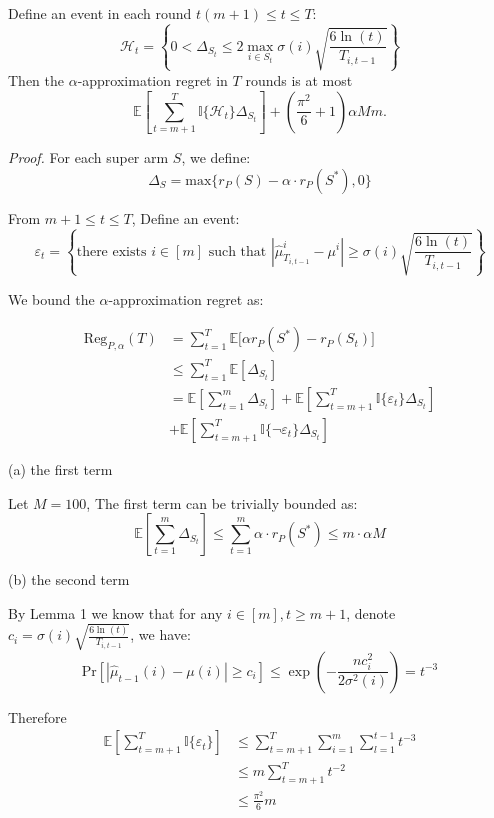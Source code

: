 \documentclass[opre,sglanonrev]{informs4}
\begin{document}
\begin{lemma}
Define an event in each round $t(m+1)\leq t \leq T$:
$$
	\mathcal{H}_t = \left\{0<\Delta_{S_t}\leq 2\mathop{\max}\limits_{i\in S_t}\sigma(i)\sqrt{\frac{6\ln(t)}{T_{i,t-1}}}\right\}
$$
Then the $\alpha$-approximation regret in $T$ rounds is at most
$$
	\mathbb{E}[\sum_{t=m+1}^{T}\mathbb{I}\{\mathcal{H}_t\}\Delta_{S_t}] + (\frac{\pi^2}{6}+1)\alpha M m.
$$
\end{lemma}
\textit{Proof.} For each super arm $S$, we define:
$$
\Delta_S = \text{max}\{r_P(S) - \alpha \cdot r_P(S^*), 0 \}
$$

From $m+1\leq t \leq T$, Define an event:
$$
\varepsilon_t = \left\{\text{there exists } i \in [m] \text{ such that } |\hat{\mu}_{T_{i,t-1}}^i-\mu^i| \geq \sigma(i)\sqrt{\frac{6\ln(t)}{T_{i,t-1}}}\right\}
$$

We bound the $\alpha$-approximation regret as:

\begin{equation}
	\begin{aligned}
		  \text{Reg}_{P,\alpha}(T) &= \sum_{t=1}^{T}\mathbb{E}\big[\alpha r_P(S^*) - r_P(S_t)\big]\\
		  &\leq \sum_{t=1}^{T}\mathbb{E}[\Delta_{S_t}]\\
		  &=\mathbb{E}[\sum_{t=1}^{m}\Delta_{S_t}]+\mathbb{E}[\sum_{t=m+1}^{T}\mathbb{I}\{\varepsilon_t\}\Delta_{S_t}]\\
		  &+\mathbb{E}[\sum_{t=m+1}^{T}\mathbb{I}\{\lnot \varepsilon_t\}\Delta_{S_t}]
	\end{aligned}
\end{equation}

(a) the first term 

Let $M  = 100$, The first term can be trivially bounded as:
\begin{equation}
	\mathbb{E}[\sum_{t=1}^{m}\Delta_{S_t}] \leq \sum_{t=1}^{m}\alpha \cdot r_P(S^*) \leq m \cdot \alpha M
\end{equation}

(b) the second term 

By Lemma 1 we know that for any $i \in [m],t\geq m+1$, denote $c_i = \sigma(i)\sqrt{\frac{6\ln(t)}{T_{i,t-1}}}$, we have:
$$
	\text{Pr}[|\hat{\mu}_{t-1}(i)-\mu(i)|\geq c_i] \leq \exp(-\frac{nc_i^2}{2\sigma^2(i)}) = t^{-3}
$$

Therefore
\begin{equation}
	\begin{aligned}
		\mathbb{E}[\sum_{t=m+1}^{T}\mathbb{I}\{\varepsilon_t\}]
		&\leq \sum_{t=m+1}^{T} \sum_{i=1}^{m} \sum_{l=1}^{t-1}t^{-3} \\
		&\leq m \sum_{t=m+1}^{T}t^{-2} \\
		&\leq \frac{\pi^2}{6}m
	\end{aligned}
\end{equation}
\end{document}
